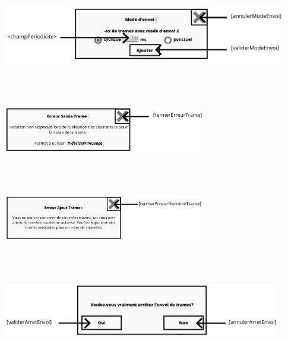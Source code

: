 \begin{minipage}{1\linewidth}
    \centering
    \includegraphics[width=0.93\textwidth]{sections/3_Exigences_specifiques/1_IHM/ihm/popUpTrame.png}
    \label{ecran_mode_trame_envoi}
\end{minipage}\\ \\

\begin{minipage}{1.3\linewidth}
    \centering
    \includegraphics[width=0.66\textwidth]{sections/3_Exigences_specifiques/1_IHM/ihm/popUpErreurTrame.png}
    \label{ecran_erreur_saisie_trame}
\end{minipage}\\ \\

\begin{minipage}{1.3\linewidth}
    \centering
    \includegraphics[width=0.66\textwidth]{sections/3_Exigences_specifiques/1_IHM/ihm/popUpErreurAjoutTrame.png}
    \label{ecran_erreur_ajout_nombre_trame}
\end{minipage}\\ \\

\begin{minipage}{1\linewidth}
    \centering
    \includegraphics[width=0.91\textwidth]{sections/3_Exigences_specifiques/1_IHM/ihm/popUpArretEnvoi.png}
    \label{ecran_arret_envoi_trame}
\end{minipage}\\ \\

